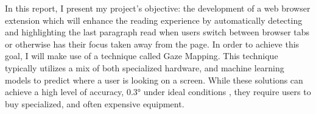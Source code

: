 \documentclass[twocolumn]{report}
\begin{document}



In this report, I present my project's objective: the development of a web browser extension which will enhance the reading experience by automatically detecting and highlighting the last paragraph read when users switch between browser tabs or otherwise has their focus taken away from the page. In order to achieve this goal, I will make use of a technique called Gaze Mapping. This technique typically utilizes a mix of both specialized hardware, and machine learning models to predict where a user is looking on a screen. While these solutions can achieve a high level of accuracy, $\ang{0.3}$ under ideal conditions \cite{tobiiprofusion}, they require users to buy specialized, and often expensive equipment. 
\end{document}
